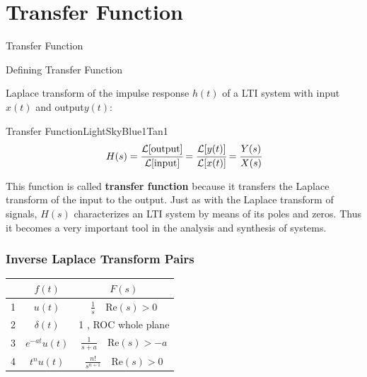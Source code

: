 \documentclass[aspectratio=169,xcolor=dvipsnames,svgnames,x11names,fleqn]{beamer}
\begin{document}
\begin{frame}{}
\vspace*{-9\baselineskip}
    \color{LightGray}{Blank space for calculation}
\end{frame}


\section{Transfer Function}


\begin{frame}{}
    \begin{center}
    \Huge \bf \color{DarkBlue}
  \faCompress
    
   Transfer Function



\end{center}
\end{frame}



\begin{frame}{Defining Transfer Function}

    Laplace transform of the impulse response $h(t)$ of a LTI system with input $x(t)$ and output$ y(t)$:

\begin{custombox}{Transfer Function}{LightSkyBlue1}{Tan1}
    $$
    H(s) = \cfrac{{\mathcal L}[\text{output}]}{{\mathcal L}[\text{input}]} = \cfrac{{\mathcal L}[y(t)]}{{\mathcal L}[x(t)]} = \cfrac{Y(s)}{X(s)}
    $$
    
\end{custombox}
    This function is called \textbf{transfer function} because it transfers the Laplace transform of the input to the output. Just as with the Laplace transform of signals, $H (s)$ characterizes an LTI system by means of its poles and zeros. Thus it becomes a very important tool in the analysis and synthesis of systems.
\end{frame}

\begin{frame}
\frametitle{Inverse Laplace Transform Pairs}
\renewcommand{\arraystretch}{2.5} %
\begin{table}
\centering
\begin{tabular}{|c|c|c|}
\hline 
& $ f(t) $ & $ F(s) $ \\
\hline \hline
1 & $ u(t) $ & $ \frac{1}{s} \quad \textrm{Re}(s) > 0 $ \\ \hline
2 & $ \delta(t) $ & 1 , \textrm{ROC whole plane}\\\hline 
3 & $ e^{-at}u(t) $ & $ \frac{1}{s+a}   \quad \textrm{Re}(s) > -a$ \\ \hline
4 & $ t^n u(t) $ & $ \frac{n!}{s^{n+1}} \quad \textrm{Re}(s) > 0 $  \\ \hline
\end{tabular}
\end{table}
\end{frame}
\end{document}
